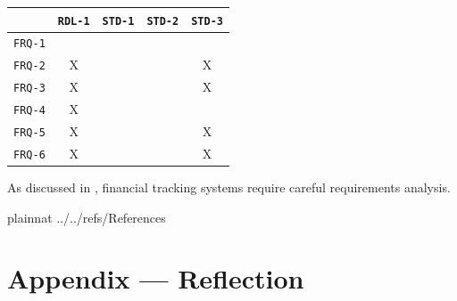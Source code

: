 \documentclass[12pt]{article}
\begin{document}
\begin{tabular}{|c|c|c|c|c|}
\hline
	& \texttt{RDL-1} & \texttt{STD-1} & \texttt{STD-2} & \texttt{STD-3} \\
\hline
\texttt{FRQ-1} &  &  &  &  \\ \hline
\texttt{FRQ-2} & X &  &  & X \\ \hline
\texttt{FRQ-3} & X &  &  & X \\ \hline
\texttt{FRQ-4} & X &  &  &  \\ \hline
\texttt{FRQ-5} & X &  &  & X \\ \hline
\texttt{FRQ-6} & X &  &  & X \\ \hline
\end{tabular}





\newpage

As discussed in \citet{Ref1}, financial tracking systems require careful requirements analysis.

 {plainnat}
 {../../refs/References}

\newpage

\section*{Appendix --- Reflection}
\end{document}

